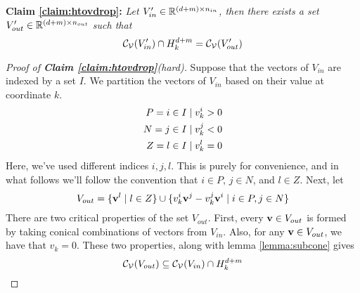 \documentclass[a4,fleqn]{article}
\begin{document}
\textbf{Claim \ref{claim:htovdrop}:} \textit{Let $V'_{in} \in \mathbb{R}^{(d+m) \times n_{in}}$, then there exists a set $V'_{out} \in \mathbb{R}^{(d+m) \times n_{out}}$ such that}
 \[ \mathcal{C}_{\mathcal{V}}(V'_{in}) \cap H_{k}^{d+m} = \mathcal{C}_{\mathcal{V}}(V'_{out}) \]
\begin{proof}[Proof of \textnormal{\textbf{Claim \ref{claim:htovdrop}}}(hard)]
Suppose that the vectors of $V_{in}$ are indexed by a set $I$.  We partition the vectors of $V_{in}$ based on their value at coordinate $k$.
\begin{align*}
  P = i \in I &\;|\; v_k^i > 0 \\
  N = j \in I &\;|\; v_k^j < 0 \\
  Z = l \in I &\;|\; v_k^l = 0
\end{align*}
Here, we've used different indices $i,j,l$.  This is purely for convenience, and in what follows we'll follow the convention that $i\in P$, $j \in N$, and $l \in Z$.
Next, let
\[ V_{out} = \{ \mathbf{v}^l \;|\; l \in Z\} \cup 
      \{v^i_k \mathbf{v}^j - v^j_k \mathbf{v}^i \;|\; i \in P, j \in N \} \]
There are two critical properties of the set $V_{out}$. First, every $\mathbf{v} \in V_{out}$ is formed by taking conical combinations of vectors from $V_{in}$.  Also, for any $\mathbf{v} \in V_{out}$, we have that $v_k = 0$.  These two properties, along with lemma \ref{lemma:subcone} gives 
\[ \mathcal{C}_{\mathcal{V}}(V_{out}) \subseteq \mathcal{C}_{\mathcal{V}}(V_{in}) \cap H^{d+m}_k \]


\end{proof}
\end{document}
